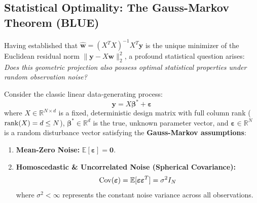 \subsection{Statistical Optimality: The Gauss-Markov Theorem (BLUE)}
Having established that $\hat{\mathbf{w}} = (X^T X)^{-1} X^T \mathbf{y}$ is the unique minimizer of the Euclidean residual norm $\|\mathbf{y} - X\mathbf{w}\|_2^2$, a profound statistical question arises: \emph{Does this geometric projection also possess optimal statistical properties under random observation noise?}

Consider the classic linear data-generating process:
\begin{equation}
\mathbf{y} = X\boldsymbol{\beta}^* + \boldsymbol{\varepsilon}
\label{eq:gauss_markov_model}
\end{equation}
where $X \in \mathbb{R}^{N \times d}$ is a fixed, deterministic design matrix with full column rank ($\operatorname{rank}(X) = d \le N$), $\boldsymbol{\beta}^* \in \mathbb{R}^d$ is the true, unknown parameter vector, and $\boldsymbol{\varepsilon} \in \mathbb{R}^N$ is a random disturbance vector satisfying the \textbf{Gauss-Markov assumptions}:
\begin{enumerate}
    \item \textbf{Mean-Zero Noise:} $\mathbb{E}[\boldsymbol{\varepsilon}] = \mathbf{0}$.
    \item \textbf{Homoscedastic \& Uncorrelated Noise (Spherical Covariance):}
    \begin{equation}
    \operatorname{Cov}(\boldsymbol{\varepsilon}) = \mathbb{E}[\boldsymbol{\varepsilon} \boldsymbol{\varepsilon}^T] = \sigma^2 I_N
    \end{equation}
    where $\sigma^2 < \infty$ represents the constant noise variance across all observations.
\end{enumerate}

